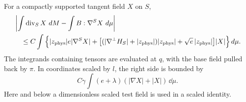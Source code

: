 \begin{lemma}\label{lt:curvedvariation}
For a compactly supported tangent field $X$ on $S$,
\begin{equation}\label{eq:lt-curvedvariation}
 \begin{split}
 &\left|\int\operatorname{div}_SX\,\mathop{}\!d M-\int B:\nabla^SX\,\mathop{}\!d\mu\right|\\
 &\quad\le C\int\Big\{|z_{\rm phys}|e|\nabla^SX|
 +\big[(|\nabla^\perp H_S|+|z_{\rm phys}|)|z_{\rm phys}|
       +\sqrt e\,|z_{\rm phys}|\big]|X|\Big\}\mathop{}\!d\mu.
 \end{split}
\end{equation}
The integrands containing tensors are evaluated at $q$, with the base field
pulled back by $\pi$.  In coordinates scaled by $l$, the right side is
bounded by
\begin{equation}\label{eq:lt-scaledvariation}
 C\gamma\int(e+\lambda)(|\nabla X|+|X|)\,\dd\mu.
\end{equation}
Here and below a dimensionless scaled test field is used in a scaled
identity.
\end{lemma}

